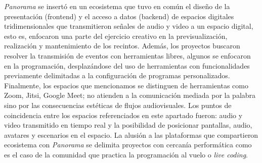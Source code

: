 

\textit{Panorama} se insertó en un ecosistema que tuvo en común el diseño de la presentación (frontend) y el acceso a datos (backend) de espacios digitales tridimensionales que transmitieron señales de audio y video a un espacio digital, esto es, enfocaron una parte del ejercicio creativo en la previsualización, realización y mantenimiento de los recintos. Además, los proyectos buscaron resolver la transmisión de eventos con herramientas libres, algunos se enfocaron en la programación, desplazándose del uso de herramientas con funcionalidades previamente delimitadas a la configuración de programas personalizados. Finalmente, los espacios que mencionamos se distinguen de herramientas como Zoom, Jitsi, Google Meet; no atienden a la comunicación mediada por la palabra sino por las consecuencias estéticas de flujos audiovisuales. Los puntos de coincidencia entre los espacios referenciados en este apartado fueron: audio y video transmitido en tiempo real y la posibilidad de posicionar pantallas, audio, avatares y escenarios en el espacio. La alusión a las plataformas que compartieron ecosistema con \textit{Panorama} se delimita proyectos con cercanía performática como es el caso de la comunidad que practica la programación al vuelo o \textit{live coding}.





